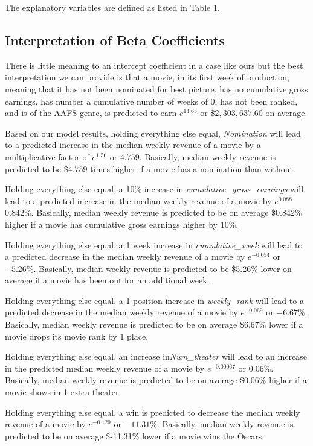 \documentclass[11pt]{article} %
\begin{document}
The explanatory variables are defined as listed in Table 1. 

\subsection{Interpretation of Beta Coefficients}

There is little meaning to an intercept coefficient in a case like ours but the best interpretation we can provide is that a movie, in its first week of production, meaning that it has not been nominated for best picture, has no cumulative gross earnings, has number a cumulative number of weeks of 0, has not been ranked, and is of the AAFS genre, is predicted to earn $e^{14.65}$ or $\$2,303,637.60$ on average.

Based on our model results, holding everything else equal, \textit{Nomination} will lead to a predicted increase in the median weekly revenue of a movie by a multiplicative factor of $e^{1.56}$ or $4.759$. Basically, median weekly revenue is predicted to be \$4.759 times higher if a movie has a nomination than without. 

Holding everything else equal, a 10\% increase in \textit{cumulative\_gross\_earnings} will lead to a predicted increase in the median weekly revenue of a movie by $e^{0.088}$ $0.842\%$.  Basically, median weekly revenue is predicted to be on average \$0.842\% higher if a movie has cumulative gross earnings higher by 10\%.


Holding everything else equal, a 1 week increase in \textit{cumulative\_week} will lead to a predicted decrease in the median weekly revenue of a movie by $e^{-0.054}$ or $-5.26\%$.  Basically, median weekly revenue is predicted to be \$5.26\% lower on average if a movie has been out for an additional week.

Holding everything else equal, a 1 position increase in \textit{weekly\_rank} will lead to a predicted decrease in the median weekly revenue of a movie by $e^{-0.069}$ or $-6.67\%$.  Basically, median weekly revenue is predicted to be on average \$6.67\% lower if a movie drops its movie rank by 1 place.

Holding everything else equal, an increase in\textit{Num\_theater} will lead to an increase in the predicted median weekly revenue of a movie by $e^{-0.00067}$ or $0.06\%$.  Basically, median weekly revenue is predicted to be on average \$0.06\% higher if a movie shows in 1 extra theater.

Holding everything else equal, a win is predicted to decrease the median weekly revenue of a movie by $e^{-0.120}$ or $-11.31\%$. Basically, median weekly revenue is predicted to be on average \$-11.31\% lower if a movie wins the Oscars.
\end{document}
